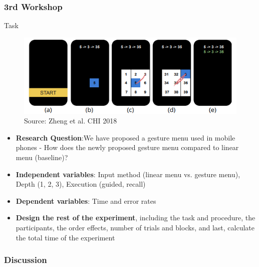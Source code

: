 \documentclass{beamer}
\begin{document}
\begin{frame}
	\frametitle{3rd Workshop}
	\begin{block}{Task}	
	\begin{figure}
		\includegraphics[width=0.5\linewidth]{gestures}
		\caption{Source: Zheng et al. CHI 2018}
	\end{figure}
	\vspace{-15pt}
	\footnotesize
	\begin{itemize}
		\item \textbf{Research Question}:We have proposed a gesture menu used in mobile phones - How does the newly proposed gesture menu compared to linear menu (baseline)?
		\item \textbf{Independent variables}: Input method (linear menu vs. gesture menu), Depth (1, 2, 3), Execution (guided, recall)
		\item \textbf{Dependent variables}: Time and error rates
		\item \textbf{Design the rest of the experiment}, including the task and procedure, the participants, the order effects, number of trials and blocks, and last, calculate the total time of the experiment
	\end{itemize}
	\end{block}
\end{frame}

\begin{frame}
	\frametitle{Discussion}
\end{frame}
\end{document}
